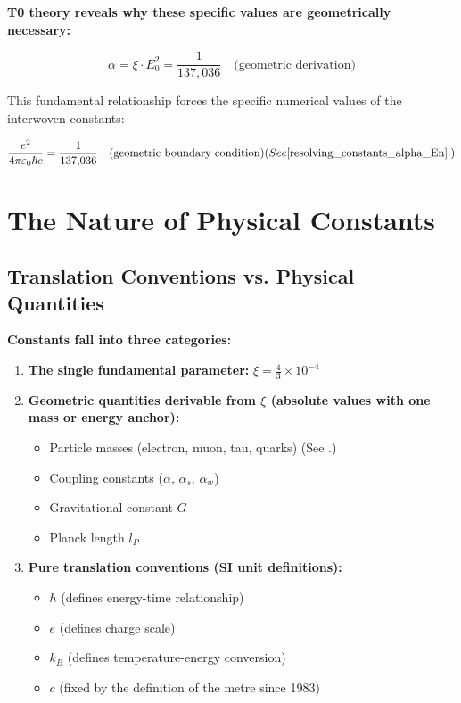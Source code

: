 	\begin{insight}
		\textbf{T0 theory reveals why these specific values are geometrically necessary:}
		
		\begin{equation}
			\alpha = \xi \cdot E_0^2 = \frac{1}{137{,}036} \quad \text{(geometric derivation)}
		\end{equation}
		
		This fundamental relationship forces the specific numerical values of the interwoven constants:
		
		\begin{equation}
			\frac{e^2}{4\pi\varepsilon_0\hbar c} = \frac{1}{137{,}036} \quad \text{(geometric boundary condition)} (See \cite{resolving_constants_alpha_En}.)
		\end{equation}
	\end{insight}
	
	\section{The Nature of Physical Constants}
	
	\subsection{Translation Conventions vs. Physical Quantities}
	
	\begin{keyresult}
		\textbf{Constants fall into three categories:}
		\begin{enumerate}
			\item \textbf{The single fundamental parameter:} $\xi = \frac{4}{3} \times 10^{-4}$
			
			\item \textbf{Geometric quantities derivable from $\xi$ (absolute values with one mass or energy anchor):}
			\begin{itemize}
				\item Particle masses (electron, muon, tau, quarks) (See \cite{particle_masses_En}.)
				\item Coupling constants ($\alpha$, $\alpha_s$, $\alpha_w$)
				\item Gravitational constant $G$
				\item Planck length $l_P$
			\end{itemize}
			
			\item \textbf{Pure translation conventions (SI unit definitions):}
			\begin{itemize}
				\item $\hbar$ (defines energy-time relationship)
				\item $e$ (defines charge scale)
				\item $k_B$ (defines temperature-energy conversion)
				\item $c$ (fixed by the definition of the metre since 1983)
			\end{itemize}
		\end{enumerate}
	\end{keyresult}
	
